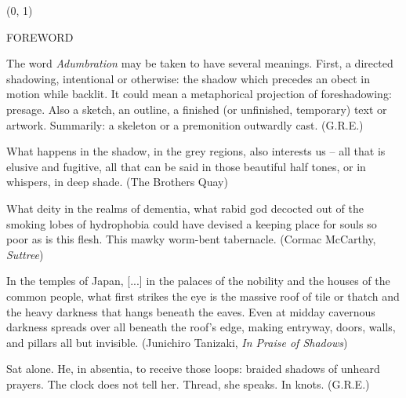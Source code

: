 \documentclass[11pt]{article}
\begin{document}
\begin{textblock}{23}(0, 1)
\begin{center}
\huge FOREWORD
\end{center}
\end{textblock}

\vspace*{0.15\baselineskip}

\begingroup
\begin{center}
The word \textit{Adumbration} may be taken to have several meanings. First, a directed shadowing, intentional or otherwise: the shadow which precedes an obect in motion while backlit. It could mean a metaphorical projection of foreshadowing: presage. Also a sketch, an outline, a finished (or unfinished, temporary) text or artwork. Summarily: a skeleton or a premonition outwardly cast.
\rightskip\leftskip
\phantom{text} \hfill (G.R.E.)
\end{center}
\endgroup

\begingroup
\begin{center}
What happens in the shadow, in the grey regions, also interests us -- all that is elusive and fugitive, all that can be said in those beautiful half tones, or in whispers, in deep shade.
\rightskip\leftskip
\phantom{text} \hfill (The Brothers Quay)
\end{center}
\endgroup

\begingroup
\begin{center}
What deity in the realms of dementia, what rabid god decocted out of the smoking lobes of hydrophobia could have devised a keeping place for souls so poor as is this flesh. This mawky worm-bent tabernacle.
\rightskip\leftskip
\phantom{text} \hfill (Cormac McCarthy, \textit{Suttree})
\end{center}
\endgroup

\begingroup
\begin{center}
In the temples of Japan, [...] in the palaces of the nobility and the houses of the common people, what first strikes the eye is the massive roof of tile or thatch and the heavy darkness that hangs beneath the eaves. Even at midday cavernous darkness spreads over all beneath the roof's edge, making entryway, doors, walls, and pillars all but invisible.
\rightskip\leftskip
\phantom{text} \hfill (Junichiro Tanizaki, \textit{In Praise of Shadows})
\end{center}
\endgroup

\begingroup
\begin{center}
Sat alone. He, in absentia, to receive those loops: braided shadows of unheard prayers. The clock does not tell her. Thread, she speaks. In knots.
\rightskip\leftskip
\phantom{text} \hfill (G.R.E.)
\end{center}
\endgroup
\end{document}
